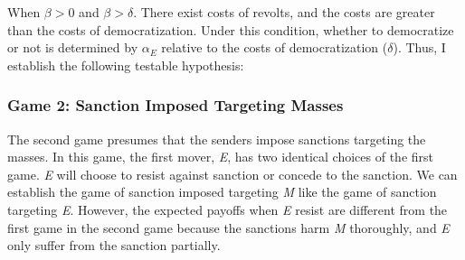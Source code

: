 \documentclass[11pt]{article}
\newtheorem{hyp}{Hypothesis}
\begin{document}
When $\beta > 0$ and $\beta > \delta$. There exist costs of revolts, and the costs are greater than the costs of democratization. Under this condition, whether to democratize or not is determined by $\alpha_{E}$ relative to the costs of democratization ($\delta$). Thus, I establish the following testable hypothesis:



	
\subsubsection*{Game 2: Sanction Imposed Targeting Masses}
\begin{center}
	
\end{center}

The second game presumes that the senders impose sanctions targeting the masses. In this game, the first mover, \textit{E}, has two identical choices of the first game. \textit{E} will choose to resist against sanction or concede to the sanction. We can establish the game of sanction imposed targeting \textit{M} like the game of sanction targeting \textit{E}. However, the expected payoffs when \textit{E} resist are different from the first game in the second game because the sanctions harm \textit{M} thoroughly, and \textit{E} only suffer from the sanction partially.
		
\end{document}
